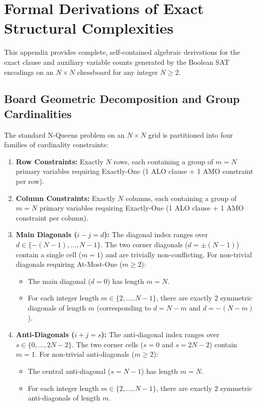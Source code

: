 \appendix
\section{Formal Derivations of Exact Structural Complexities}
\label{sec:appendix_proofs}

This appendix provides complete, self-contained algebraic derivations for the exact clause and auxiliary variable counts generated by the Boolean SAT encodings on an $N \times N$ chessboard for any integer $N \ge 2$.

\subsection{Board Geometric Decomposition and Group Cardinalities}
\label{subsec:board_decomposition}

The standard N-Queens problem on an $N \times N$ grid is partitioned into four families of cardinality constraints:
\begin{enumerate}
    \item \textbf{Row Constraints:} Exactly $N$ rows, each containing a group of $m = N$ primary variables requiring Exactly-One (1 ALO clause + 1 AMO constraint per row).
    \item \textbf{Column Constraints:} Exactly $N$ columns, each containing a group of $m = N$ primary variables requiring Exactly-One (1 ALO clause + 1 AMO constraint per column).
    \item \textbf{Main Diagonals ($i - j = d$):} The diagonal index ranges over $d \in \{-(N-1), \dots, N-1\}$. The two corner diagonals ($d = \pm (N-1)$) contain a single cell ($m=1$) and are trivially non-conflicting. For non-trivial diagonals requiring At-Most-One ($m \ge 2$):
    \begin{itemize}
        \item The main diagonal ($d = 0$) has length $m = N$.
        \item For each integer length $m \in \{2, \dots, N-1\}$, there are exactly $2$ symmetric diagonals of length $m$ (corresponding to $d = N - m$ and $d = -(N - m)$).
    \end{itemize}
    \item \textbf{Anti-Diagonals ($i + j = s$):} The anti-diagonal index ranges over $s \in \{0, \dots, 2N-2\}$. The two corner cells ($s = 0$ and $s = 2N-2$) contain $m=1$. For non-trivial anti-diagonals ($m \ge 2$):
    \begin{itemize}
        \item The central anti-diagonal ($s = N-1$) has length $m = N$.
        \item For each integer length $m \in \{2, \dots, N-1\}$, there are exactly $2$ symmetric anti-diagonals of length $m$.
    \end{itemize}
\end{enumerate}

